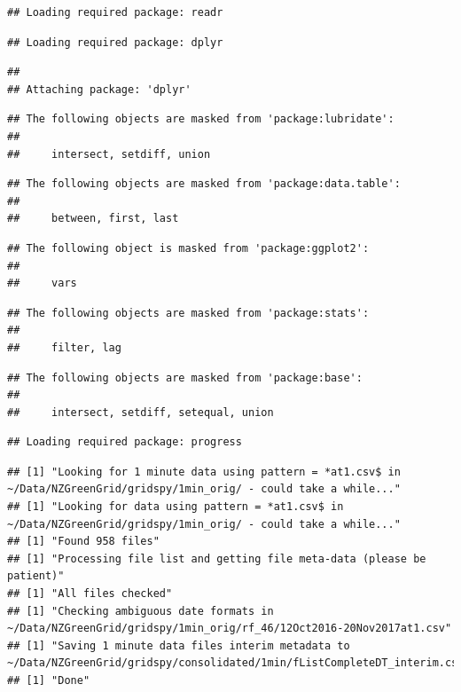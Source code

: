 \documentclass[]{article}
\begin{document}
\begin{verbatim}
## Loading required package: readr
\end{verbatim}

\begin{verbatim}
## Loading required package: dplyr
\end{verbatim}

\begin{verbatim}
## 
## Attaching package: 'dplyr'
\end{verbatim}

\begin{verbatim}
## The following objects are masked from 'package:lubridate':
## 
##     intersect, setdiff, union
\end{verbatim}

\begin{verbatim}
## The following objects are masked from 'package:data.table':
## 
##     between, first, last
\end{verbatim}

\begin{verbatim}
## The following object is masked from 'package:ggplot2':
## 
##     vars
\end{verbatim}

\begin{verbatim}
## The following objects are masked from 'package:stats':
## 
##     filter, lag
\end{verbatim}

\begin{verbatim}
## The following objects are masked from 'package:base':
## 
##     intersect, setdiff, setequal, union
\end{verbatim}

\begin{verbatim}
## Loading required package: progress
\end{verbatim}

\begin{verbatim}
## [1] "Looking for 1 minute data using pattern = *at1.csv$ in ~/Data/NZGreenGrid/gridspy/1min_orig/ - could take a while..."
## [1] "Looking for data using pattern = *at1.csv$ in ~/Data/NZGreenGrid/gridspy/1min_orig/ - could take a while..."
## [1] "Found 958 files"
## [1] "Processing file list and getting file meta-data (please be patient)"
## [1] "All files checked"
## [1] "Checking ambiguous date formats in ~/Data/NZGreenGrid/gridspy/1min_orig/rf_46/12Oct2016-20Nov2017at1.csv"
## [1] "Saving 1 minute data files interim metadata to ~/Data/NZGreenGrid/gridspy/consolidated/1min/fListCompleteDT_interim.csv"
## [1] "Done"
\end{verbatim}
\end{document}
